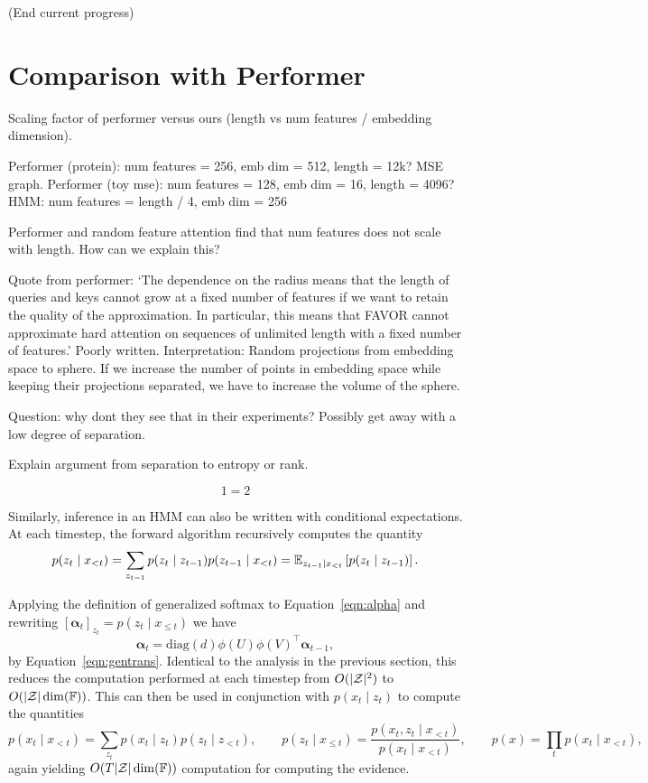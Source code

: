 \documentclass{article}
\begin{document}
(End current progress)

\section{Comparison with Performer}
Scaling factor of performer versus ours (length vs num features / embedding dimension).

Performer (protein): num features = 256, emb dim = 512, length = 12k?
MSE graph.
Performer (toy mse): num features = 128, emb dim = 16, length = 4096?
HMM: num features = length / 4, emb dim = 256

Performer and random feature attention find that num features does not scale with
length. How can we explain this?

Quote from performer:
`The dependence on the radius means that the length of queries and keys cannot grow
at a fixed number of features if we want to
retain the quality of the approximation.
In particular, this means that FAVOR cannot approximate
hard attention on sequences of unlimited length with a fixed number of features.'
Poorly written.
Interpretation: Random projections from embedding space to sphere.
If we increase the number of points in embedding space while keeping
their projections separated, we have to increase the volume of the sphere.

Question: why dont they see that in their experiments?
Possibly get away with a low degree of separation.

Explain argument from separation to entropy or rank.

\begin{equation}
1 = 2
\end{equation}

Similarly, inference in an HMM can also be written with conditional expectations.
At each timestep, the forward algorithm recursively computes the quantity
\begin{equation}
\label{eqn:alpha}
p(z_t \mid x_{<t})
= \sum_{z_{t-1}} p(z_t \mid z_{t-1})p(z_{t-1}\mid x_{<t})
= \mathbb{E}_{z_{t-1}\mid x_{<t}}\left[p(z_t \mid z_{t-1})\right].
\end{equation}

Applying the definition of generalized softmax to Equation~\ref{eqn:alpha}
and rewriting $[\bm\alpha_t]_{z_t} = p(z_t \mid x_{\le t})$
we have
\begin{equation}
\bm\alpha_t = \textrm{diag}(d)\phi(U)\phi(V)^\top\bm\alpha_{t-1},
\end{equation}
by Equation~\ref{eqn:gentrans}.
Identical to the analysis in the previous section, this reduces the computation
performed at each timestep from $O(|\mathcal{Z}|^2)$ to $O(|\mathcal{Z}|\dim(\mathbb{F}))$.
This can then be used in conjunction with $p(x_t \mid z_t)$ to compute
the quantities
$$
p(x_t \mid x_{<t}) = \sum_{z_t}p(x_t \mid z_t)p(z_t \mid z_{<t}),
\qquad
p(z_t \mid x_{\le t}) = \frac{p(x_t, z_t \mid x_{<t})}{p(x_t \mid x_{<t})},
\qquad
p(x) = \prod_t p(x_t \mid x_{<t}),
$$
again yielding $O(T|\mathcal{Z}|\dim(\mathbb{F}))$ computation for computing the evidence.
\end{document}
